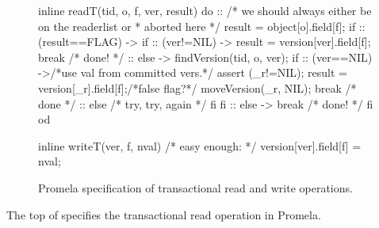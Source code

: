 \begin{figure}
\begin{inlinecode}
inline readT(tid, o, f, ver, result) {
  do
  ::
     /* we should always either be on the readerlist or
      * aborted here */
     result = object[o].field[f];
     if
     :: (result==FLAG) ->
        if
        :: (ver!=NIL) ->
           result = version[ver].field[f];
           break /* done! */
        :: else ->
           findVersion(tid, o, ver);
           if
           :: (ver==NIL) ->/*use val from committed vers.*/
              assert (_r!=NIL);
              result = version[_r].field[f];/*false flag?*/
              moveVersion(_r, NIL);
              break /* done */
           :: else /* try, try, again */
           fi
        fi
     :: else -> break /* done! */
     fi
  od
}

inline writeT(ver, f, nval) {
  /* easy enough: */
  version[ver].field[f] = nval;
}
\end{inlinecode}
\caption{Promela specification of transactional read and write operations.}
\label{fig:promrwt}
\end{figure}
The top of  specifies the transactional read operation in
Promela.

